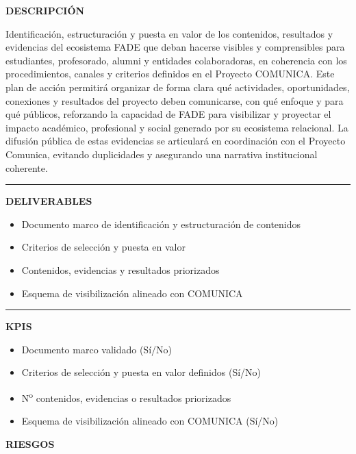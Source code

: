 \documentclass[11pt,a4paper]{scrreprt}
\newcommand{\fieldlabel}[1]{%
  {\footnotesize\sffamily\bfseries\color{mutedcolor}\MakeUppercase{#1}}\par\nopagebreak[4]
}
\newcommand{\fieldsep}{\vspace{3pt}\noindent\textcolor{bordercolor}{\rule{\linewidth}{0.4pt}}\vspace{3pt}\par}
\begin{document}
\begin{tcolorbox}[pabox={filcolor}{PA4.1 \enspace\textbullet\enspace Estructuración, visibilización y puesta en valor del impacto del ecosistema FADE}]

\fieldlabel{Descripci\'on}
{\small Identificación, estructuración y puesta en valor de los contenidos, resultados y evidencias del ecosistema FADE que deban hacerse visibles y comprensibles para estudiantes, profesorado, alumni y entidades colaboradoras, en coherencia con los procedimientos, canales y criterios definidos en el Proyecto COMUNICA. Este plan de acción permitirá organizar de forma clara qué actividades, oportunidades, conexiones y resultados del proyecto deben comunicarse, con qué enfoque y para qué públicos, reforzando la capacidad de FADE para visibilizar y proyectar el impacto académico, profesional y social generado por su ecosistema relacional. La difusión pública de estas evidencias se articulará en coordinación con el Proyecto Comunica, evitando duplicidades y asegurando una narrativa institucional coherente. 
 }\par
\fieldsep
\fieldlabel{Deliverables}
{\small \begin{itemize}[noitemsep,topsep=2pt]
\item Documento marco de identificación y estructuración de contenidos
\item Criterios de selección y puesta en valor
\item Contenidos, evidencias y resultados priorizados
\item Esquema de visibilización alineado con COMUNICA
\end{itemize}}\par
\fieldsep
\fieldlabel{KPIs}
{\small \begin{itemize}[noitemsep,topsep=2pt]
\item Documento marco validado (Sí/No)
\item Criterios de selección y puesta en valor definidos (Sí/No)
\item N\textsuperscript{o} contenidos, evidencias o resultados priorizados
\item Esquema de visibilización alineado con COMUNICA (Sí/No)
\end{itemize}}\par
\end{tcolorbox}
\begin{tcolorbox}[riskbox]
{\footnotesize\sffamily\bfseries\color{red!50!black} RIESGOS}\par{}
\end{tcolorbox}
\end{document}
